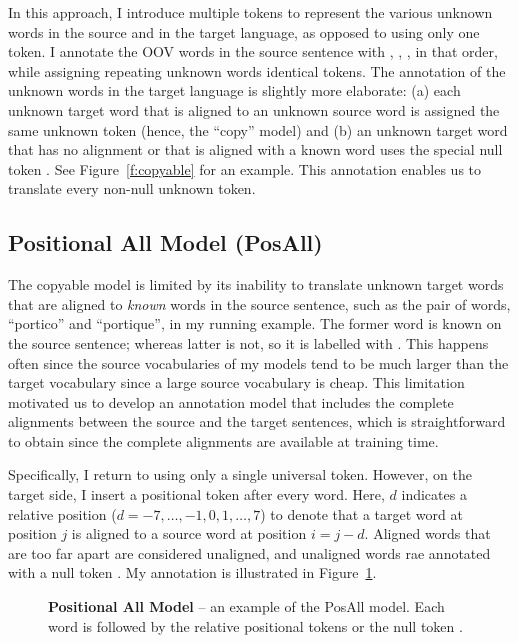 In this approach, I introduce multiple tokens to represent the various unknown words in the 
source and in the target language, as opposed to using only one \unksym{} token. 
I annotate the OOV words in the source sentence
with , , , in that order,
while assigning repeating unknown words identical tokens. 
The annotation of the unknown words in the target language is slightly more elaborate: (a) each 
unknown target word that is aligned to an unknown source word
is assigned the same unknown token (hence, the ``copy'' model) and 
(b) an unknown target word that has no 
alignment or that is aligned with a known word uses the special null token \unknull{}. 
See Figure~\ref{f:copyable} for an example.  This annotation enables us to 
translate every non-null unknown token.

\subsection{Positional All Model (PosAll)}
The copyable model is limited by its inability to translate unknown 
target words that are aligned to \emph{known} words in the source sentence, such as the pair of 
words, ``portico'' and ``portique'', in my running example. 
The former word is known on the source sentence; whereas latter is not, so it is labelled with \unknull{}.
This happens often since the source vocabularies of my models tend to be much 
larger than the target vocabulary since a large source vocabulary is cheap.
This limitation motivated us to develop an annotation model that includes the complete 
alignments between the source and the target sentences, which is straightforward to obtain
 since the complete alignments are available at training time.  

Specifically, I return to using only a single universal \unksym{} token. 
However, on the target side, 
I insert a positional token  after every word. Here, $d$ indicates a relative position 
($d=-7,\ldots,-1,0,1,\ldots,7$) to denote that a target word at position $j$ is aligned 
to a source word 
at position $i=j-d$. Aligned words that are too far apart are considered unaligned, and 
unaligned words rae annotated
with a null token . My annotation is illustrated in 
Figure~\ref{f:pos_all}.

\begin{figure}
\caption[Positional All Model]{ {\bf Positional All Model} -- an example of the PosAll model. Each word is followed by the relative positional tokens  or the null token \posnull{}. }
\label{f:pos_all}
\end{figure}

